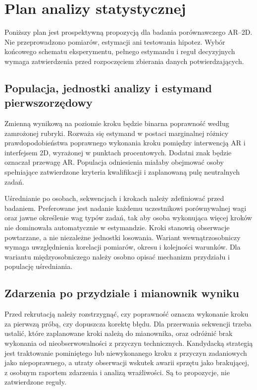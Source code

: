 \documentclass[11pt,a4paper]{article}
\begin{document}
\section{Plan analizy statystycznej}
Poniższy plan jest prospektywną propozycją dla badania porównawczego AR--2D. Nie przeprowadzono pomiarów, estymacji ani testowania hipotez. Wybór końcowego schematu eksperymentu, pełnego estymandu i reguł decyzyjnych wymaga zatwierdzenia przed rozpoczęciem zbierania danych potwierdzających.

\subsection{Populacja, jednostki analizy i estymand pierwszorzędowy}
Zmienną wynikową na poziomie kroku będzie binarna poprawność według zamrożonej rubryki. Rozważa się estymand w postaci marginalnej różnicy prawdopodobieństwa poprawnego wykonania kroku pomiędzy interwencją AR i interfejsem 2D, wyrażonej w punktach procentowych. Dodatni znak będzie oznaczał przewagę AR. Populacja odniesienia miałaby obejmować osoby spełniające zatwierdzone kryteria kwalifikacji i zaplanowaną pulę neutralnych zadań.

Uśrednianie po osobach, sekwencjach i krokach należy zdefiniować przed badaniem. Preferowane jest nadanie każdemu uczestnikowi porównywalnej wagi oraz jawne określenie wag typów zadań, tak aby osoba wykonująca więcej kroków nie dominowała automatycznie w estymandzie. Kroki stanowią obserwacje powtarzane, a nie niezależne jednostki losowania. Wariant wewnątrzosobniczy wymaga uwzględnienia korelacji pomiarów, okresu i kolejności warunków. Dla wariantu międzyosobniczego należy osobno opisać mechanizm przydziału i populację uśredniania.

\subsection{Zdarzenia po przydziale i mianownik wyniku}
Przed rekrutacją należy rozstrzygnąć, czy poprawność oznacza wykonanie kroku za pierwszą próbą, czy dopuszcza korektę błędu. Dla przerwania sekwencji trzeba ustalić, które zaplanowane kroki należą do mianownika, oraz odróżnić brak wykonania od nieobserwowalności z przyczyn technicznych. Kandydacką strategią jest traktowanie pominiętego lub niewykonanego kroku z przyczyn zadaniowych jako niepoprawnego, a utraty obserwacji wskutek awarii sprzętu jako brakującej, z osobnym raportem zdarzenia i analizą wrażliwości. Są to propozycje, nie zatwierdzone reguły.
\end{document}
